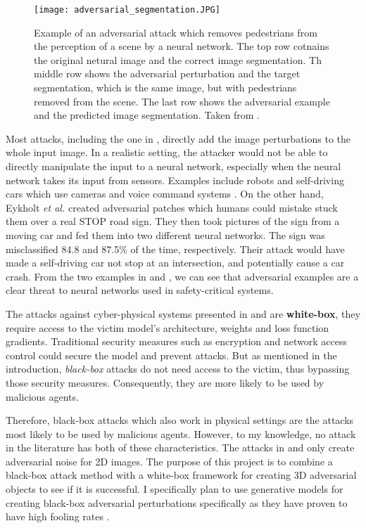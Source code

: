 \documentclass[11pt, a4paper, oneside]{article}
\begin{document}
\begin{figure}[h]
    \centering
    \texttt{[image: adversarial\_segmentation.JPG]}
    \caption{Example of an adversarial attack which removes pedestrians from the perception of a scene by a neural network. The top row cotnains the original netural image and the correct image segmentation. Th middle row shows the adversarial perturbation and the target segmentation, which is the same image, but with pedestrians removed from the scene. The last row shows the adversarial example and the predicted image segmentation. Taken from \cite{Metzen_2017_ICCV}.}
    \label{fig:adversarial_segmentation}
\end{figure}

Most attacks, including the one in \cite{Metzen_2017_ICCV}, directly add the image perturbations to the whole input image. In a realistic setting, the attacker would not be able to directly manipulate the input to a neural network, especially when the neural network takes its input from sensors. Examples include robots and self-driving cars which use cameras and voice command systems \cite{kurakin2016adversarial}. On the other hand, Eykholt \textit{et al.} \cite{evtimov_road_signs} created adversarial patches which humans could mistake stuck them over a real STOP road sign. They then took pictures of the sign from a moving car and fed them into two different neural networks. The sign was misclassified 84.8 and 87.5\% of the time, respectively. Their attack would have made a self-driving car not stop at an intersection, and potentially cause a car crash. From the two examples in \cite{evtimov_road_signs} and \cite{Metzen_2017_ICCV}, we can see that adversarial examples are a clear threat to neural networks used in safety-critical systems.

The attacks against cyber-physical systems presented in \cite{athalye} and \cite{evtimov_road_signs} are \textbf{white-box}, they require access to the victim model's architecture, weights and loss function gradients. Traditional security measures such as encryption and network access control could secure the model and prevent attacks. But as mentioned in the introduction, \textit{black-box} attacks do not need access to the victim, thus bypassing those security measures. Consequently, they are more likely to be used by malicious agents. 

Therefore, black-box attacks which also work in physical settings are the attacks most likely to be used by malicious agents. However, to my knowledge, no attack in the literature has both of these characteristics. The attacks in \cite{upset_angri} and \cite{zheng_black_box_GAN} only create adversarial noise for 2D images. The purpose of this project is to combine a black-box attack method with a white-box framework for creating 3D adversarial objects to see if it is successful. I specifically plan to use generative models for creating black-box adversarial perturbations specifically as they have proven to have high fooling rates \cite{upset_angri, zheng_black_box_GAN}.
\end{document}
